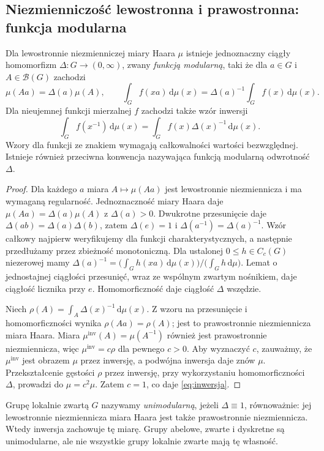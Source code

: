 \subsection*{Niezmienniczość lewostronna i prawostronna: funkcja modularna}
\begin{twierdzenie}
Dla lewostronnie niezmienniczej miary Haara $\mu$ istnieje jednoznaczny ciągły homomorfizm $\Delta:G\to(0,\infty)$, zwany \emph{funkcją modularną}, taki że dla $a\in G$ i $A\in\mathcal B(G)$ zachodzi
\begin{equation}\label{eq:modularna}
\mu(Aa)=\Delta(a)\mu(A),\qquad
\int_G f(xa)\,\mathrm d\mu(x)=\Delta(a)^{-1}\int_Gf(x)\,\mathrm d\mu(x).
\end{equation}
Dla nieujemnej funkcji mierzalnej $f$ zachodzi także wzór inwersji
\begin{equation}\label{eq:inwersja}
\int_G f(x^{-1})\,\mathrm d\mu(x)=\int_G f(x)\Delta(x)^{-1}\,\mathrm d\mu(x).
\end{equation}
Wzory dla funkcji ze znakiem wymagają całkowalności wartości bezwzględnej. Istnieje również przeciwna konwencja nazywająca funkcją modularną odwrotność $\Delta$.
\end{twierdzenie}
\begin{proof}
Dla każdego $a$ miara $A\mapsto\mu(Aa)$ jest lewostronnie niezmiennicza i ma wymaganą regularność. Jednoznaczność miary Haara daje $\mu(Aa)=\Delta(a)\mu(A)$ z $\Delta(a)>0$. Dwukrotne przesunięcie daje $\Delta(ab)=\Delta(a)\Delta(b)$, zatem $\Delta(e)=1$ i $\Delta(a^{-1})=\Delta(a)^{-1}$. Wzór całkowy najpierw weryfikujemy dla funkcji charakterystycznych, a następnie przedłużamy przez zbieżność monotoniczną. Dla ustalonej $0\le h\in C_c(G)$ niezerowej mamy
$\Delta(a)^{-1}=\bigl(\int_Gh(xa)\,\mathrm d\mu(x)\bigr)/\bigl(\int_Gh\,\mathrm d\mu\bigr)$.
Lemat o jednostajnej ciągłości przesunięć, wraz ze wspólnym zwartym nośnikiem, daje ciągłość licznika przy $e$. Homomorficzność daje ciągłość $\Delta$ wszędzie.

Niech $\rho(A)=\int_A\Delta(x)^{-1}\,\mathrm d\mu(x)$. Z wzoru na przesunięcie i homomorficzności wynika $\rho(Aa)=\rho(A)$; jest to prawostronnie niezmiennicza miara Haara. Miara $\mu^{\mathrm{inv}}(A)=\mu(A^{-1})$ również jest prawostronnie niezmiennicza, więc $\mu^{\mathrm{inv}}=c\rho$ dla pewnego $c>0$. Aby wyznaczyć $c$, zauważmy, że $\mu^{\mathrm{inv}}$ jest obrazem $\mu$ przez inwersję, a podwójna inwersja daje znów $\mu$. Przekształcenie gęstości $\rho$ przez inwersję, przy wykorzystaniu homomorficzności $\Delta$, prowadzi do $\mu=c^2\mu$. Zatem $c=1$, co daje \eqref{eq:inwersja}.
\end{proof}
\begin{definicja}
Grupę lokalnie zwartą $G$ nazywamy \emph{unimodularną}, jeżeli $\Delta\equiv1$, równoważnie: jej lewostronnie niezmiennicza miara Haara jest także prawostronnie niezmiennicza. Wtedy inwersja zachowuje tę miarę. Grupy abelowe, zwarte i dyskretne są unimodularne, ale nie wszystkie grupy lokalnie zwarte mają tę własność.
\end{definicja}

